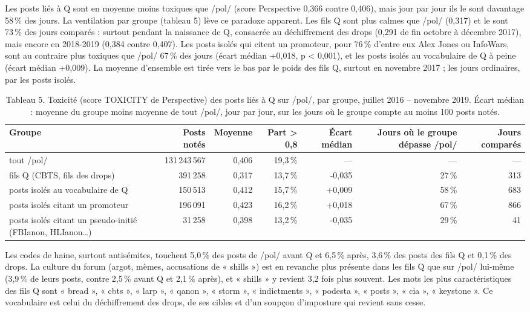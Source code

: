 \documentclass[11pt,a4paper]{article}
\begin{document}
Les posts liés à Q sont en moyenne moins toxiques que /pol/ (score Perspective 0,366 contre 0,406), mais jour par jour ils le sont davantage 58 \% des jours. La ventilation par groupe (tableau 5) lève ce paradoxe apparent. Les fils Q sont plus calmes que /pol/ (0,317) et le sont 73 \% des jours comparés : surtout pendant la naissance de Q, consacrée au déchiffrement des drops (0,291 de fin octobre à décembre 2017), mais encore en 2018-2019 (0,384 contre 0,407). Les posts isolés qui citent un promoteur, pour 76 \% d'entre eux Alex Jones ou InfoWars, sont au contraire plus toxiques que /pol/ 67 \% des jours (écart médian +0,018, p < 0,001), et les posts isolés au vocabulaire de Q à peine (écart médian +0,009). La moyenne d'ensemble est tirée vers le bas par le poids des fils Q, surtout en novembre 2017 ; les jours ordinaires, par les posts isolés.

\begin{table}[htbp]
\centering\small
\caption*{Tableau 5. Toxicité (score TOXICITY de Perspective) des posts liés à Q sur /pol/, par groupe, juillet 2016 – novembre 2019. Écart médian : moyenne du groupe moins moyenne de tout /pol/, jour par jour, sur les jours où le groupe compte au moins 100 posts notés.}
\begin{adjustbox}{max width=\linewidth}
\begin{tabular}{lrrrrrr}
\toprule
\textbf{Groupe} & \textbf{Posts notés} & \textbf{Moyenne} & \textbf{Part > 0,8} & \textbf{Écart médian} & \textbf{Jours où le groupe dépasse /pol/} & \textbf{Jours comparés} \\
\midrule
tout /pol/ & 131 243 567 & 0,406 & 19,3 \% & — & — & — \\
fils Q (CBTS, fils des drops) & 391 258 & 0,317 & 13,7 \% & -0,035 & 27 \% & 313 \\
posts isolés au vocabulaire de Q & 150 513 & 0,412 & 15,7 \% & +0,009 & 58 \% & 683 \\
posts isolés citant un promoteur & 196 091 & 0,423 & 16,2 \% & +0,018 & 67 \% & 866 \\
posts isolés citant un pseudo-initié (FBIanon, HLIanon…) & 31 258 & 0,398 & 13,2 \% & -0,035 & 29 \% & 41 \\
\bottomrule
\end{tabular}
\end{adjustbox}
\end{table}

Les codes de haine, surtout antisémites, touchent 5,0 \% des posts de /pol/ avant Q et 6,5 \% après, 3,6 \% des posts des fils Q et 0,1 \% des drops. La culture du forum (argot, mèmes, accusations de « shills ») est en revanche plus présente dans les fils Q que sur /pol/ lui-même (3,9 \% de leurs posts, contre 2,5 \% avant Q et 2,1 \% après), et « shills » y revient 3,2 fois plus souvent. Les mots les plus caractéristiques des fils Q \parencite{monroe2008fightin} sont « bread », « cbts », « larp », « qanon », « storm », « indictments », « podesta », « posts », « cia », « keystone ». Ce vocabulaire est celui du déchiffrement des drops, de ses cibles et d'un soupçon d'imposture qui revient sans cesse.
\end{document}
